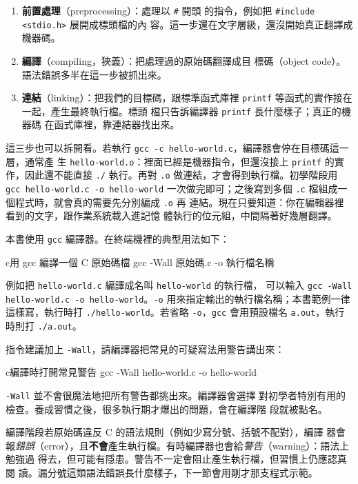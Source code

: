 \begin{enumerate}
    \item \textbf{前置處理}（preprocessing）：處理以 \texttt{\#} 開頭
          的指令，例如把 \texttt{\#include <stdio.h>} 展開成標頭檔的內
          容。這一步還在文字層級，還沒開始真正翻譯成機器碼。
    \item \textbf{編譯}（compiling，狹義）：把處理過的原始碼翻譯成目
          標碼（object code）。語法錯誤多半在這一步被抓出來。
    \item \textbf{連結}（linking）：把我們的目標碼，跟標準函式庫裡
          \texttt{printf} 等函式的實作接在一起，產生最終執行檔。標頭
          檔只告訴編譯器 \texttt{printf} 長什麼樣子；真正的機器碼
          在函式庫裡，靠連結器找出來。
\end{enumerate}

這三步也可以拆開看。若執行
\texttt{gcc -c hello-world.c}，編譯器會停在目標碼這一層，通常產
生 \texttt{hello-world.o}：裡面已經是機器指令，但還沒接上
\texttt{printf} 的實作，因此還不能直接 \texttt{./} 執行。再對
\texttt{.o} 做連結，才會得到執行檔。初學階段用
\texttt{gcc hello-world.c -o hello-world} 一次做完即可；之後寫到多個
\texttt{.c} 檔組成一個程式時，就會真的需要先分別編成 \texttt{.o} 再
連結。現在只要知道：你在編輯器裡看到的文字，跟作業系統載入進記憶
體執行的位元組，中間隔著好幾層翻譯。

本書使用 \texttt{gcc} 編譯器。在終端機裡的典型用法如下：

\begin{code}{c}{用 gcc 編譯一個 C 原始碼檔}
gcc -Wall 原始碼.c -o 執行檔名稱
\end{code}

例如把 \texttt{hello-world.c} 編譯成名叫 \texttt{hello-world} 的執行檔，
可以輸入 \texttt{gcc -Wall hello-world.c -o hello-world}。\texttt{-o}
用來指定輸出的執行檔名稱；本書範例一律這樣寫，執行時打
\texttt{./hello-world}。若省略 \texttt{-o}，\texttt{gcc} 會用預設檔名
\texttt{a.out}，執行時則打 \texttt{./a.out}。

指令建議加上 \texttt{-Wall}，請編譯器把常見的可疑寫法用警告講出來：

\begin{code}{c}{編譯時打開常見警告}
gcc -Wall hello-world.c -o hello-world
\end{code}

\texttt{-Wall} 並不會很魔法地把所有警告都挑出來。編譯器會選擇
對初學者特別有用的檢查。養成習慣之後，很多執行期才爆出的問題，會在編譯階
段就被點名。

編譯階段若原始碼違反 C 的語法規則（例如少寫分號、括號不配對），編譯
器會報\emph{錯誤}（error），且\textbf{不會}產生執行檔。有時編譯器也會給\emph{警告}（warning）：語法上勉強過
得去，但可能有隱患。警告不一定會阻止產生執行檔，但習慣上仍應認真閱
讀。漏分號這類語法錯誤長什麼樣子，下一節會用剛才那支程式示範。

